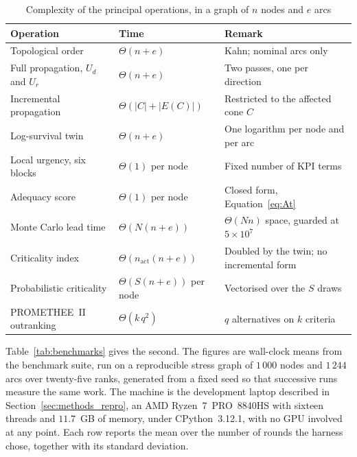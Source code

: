 \begin{table}[htbp]
\centering
\caption[Complexity of the principal operations]{Complexity of the principal operations, in a
graph of $n$ nodes and $e$ arcs}
\label{tab:complexity}
\small
\begin{tabularx}{\linewidth}{@{}l l X@{}}
\toprule
\textbf{Operation} & \textbf{Time} & \textbf{Remark} \\
\midrule
Topological order & $\Theta(n + e)$ & Kahn; nominal arcs only \\
Full propagation, $U_d$ and $U_r$ & $\Theta(n + e)$ & Two passes, one per direction \\
Incremental propagation & $\Theta(|C| + |E(C)|)$ & Restricted to the affected cone $C$ \\
Log-survival twin & $\Theta(n + e)$ & One logarithm per node and per arc \\
Local urgency, six blocks & $\Theta(1)$ per node & Fixed number of KPI terms \\
Adequacy score & $\Theta(1)$ per node & Closed form, Equation~\ref{eq:At} \\
Monte Carlo lead time & $\Theta(N(n+e))$ & $\Theta(Nn)$ space, guarded at $5\times10^{7}$ \\
Criticality index & $\Theta(n_{\text{act}}(n+e))$ & Doubled by the twin; no incremental form \\
Probabilistic criticality & $\Theta(S(n+e))$ per node & Vectorised over the $S$ draws \\
PROMETHEE~II outranking & $\Theta(k\,q^{2})$ & $q$ alternatives on $k$ criteria \\
\bottomrule
\end{tabularx}
\end{table}

Table~\ref{tab:benchmarks} gives the second. The figures are wall-clock means from the
benchmark suite, run on a reproducible stress graph of $1\,000$ nodes and $1\,244$ arcs over
twenty-five ranks, generated from a fixed seed so that successive runs measure the same work.
The machine is the development laptop described in Section~\ref{sec:methods_repro}, an AMD
Ryzen~7~PRO~8840HS with sixteen threads and $11.7$~GB of memory, under CPython~3.12.1, with no
GPU involved at any point. Each row reports the mean over the number of rounds the harness
chose, together with its standard deviation.

